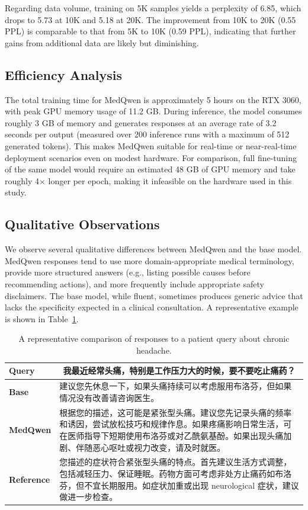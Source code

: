 \documentclass[11pt,a4paper]{article}
\begin{document}
Regarding data volume, training on 5K samples yields a perplexity of 6.85, which drops to 5.73 at 10K and 5.18 at 20K. The improvement from 10K to 20K (0.55 PPL) is comparable to that from 5K to 10K (0.59 PPL), indicating that further gains from additional data are likely but diminishing.

\subsection{Efficiency Analysis}

The total training time for MedQwen is approximately 5 hours on the RTX 3060, with peak GPU memory usage of 11.2 GB. During inference, the model consumes roughly 3 GB of memory and generates responses at an average rate of 3.2 seconds per output (measured over 200 inference runs with a maximum of 512 generated tokens). This makes MedQwen suitable for real-time or near-real-time deployment scenarios even on modest hardware. For comparison, full fine-tuning of the same model would require an estimated 48 GB of GPU memory and take roughly 4$\times$ longer per epoch, making it infeasible on the hardware used in this study.

\subsection{Qualitative Observations}

We observe several qualitative differences between MedQwen and the base model. MedQwen responses tend to use more domain-appropriate medical terminology, provide more structured answers (e.g., listing possible causes before recommending actions), and more frequently include appropriate safety disclaimers. The base model, while fluent, sometimes produces generic advice that lacks the specificity expected in a clinical consultation. A representative example is shown in Table~\ref{tab:qualitative}.

\begin{table}[ht]
\centering
\caption{A representative comparison of responses to a patient query about chronic headache.}
\label{tab:qualitative}
\begin{tabular}{p{3cm}p{5.5cm}}
\toprule
\textbf{Query} & \multicolumn{1}{c}{\textbf{我最近经常头痛，特别是工作压力大的时候，要不要吃止痛药？}} \\
\midrule
\textbf{Base} & 建议您先休息一下，如果头痛持续可以考虑服用布洛芬，但如果情况没有改善请咨询医生。 \\
\midrule
\textbf{MedQwen} & 根据您的描述，这可能是紧张型头痛。建议您先记录头痛的频率和诱因，尝试放松技巧和规律作息。如果疼痛影响日常生活，可在医师指导下短期使用布洛芬或对乙酰氨基酚。如果出现头痛加剧、伴随恶心呕吐或视力改变，请及时就医。 \\
\midrule
\textbf{Reference} & 您描述的症状符合紧张型头痛的特点。首先建议生活方式调整，包括减轻压力、保证睡眠。药物方面可考虑非处方止痛药如布洛芬，但不宜长期服用。如症状加重或出现 neurological 症状，建议做进一步检查。 \\
\bottomrule
\end{tabular}
\end{table}
\end{document}
